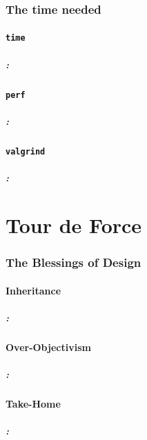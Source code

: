 \documentclass[9pt,xcolor=table]{beamer}
\begin{document}
\section[Measurement]{The time needed}
\subsection{\texttt{time}}
\begin{frame}
\frametitle{\insertsectionhead{}: \insertsubsectionhead{}}
\end{frame}

\subsection{\texttt{perf}}
\begin{frame}
\frametitle{\insertsectionhead{}: \insertsubsectionhead{}}
\end{frame}

\subsection{\texttt{valgrind}}
\begin{frame}
\frametitle{\insertsectionhead{}: \insertsubsectionhead{}}
\end{frame}


\part{Tour de Force}
\section{The Blessings of Design}
\subsection{Inheritance}
\begin{frame}
\frametitle{\insertsectionhead{}: \insertsubsectionhead{}}
\end{frame}

\subsection{Over-Objectivism}
\begin{frame}
\frametitle{\insertsectionhead{}: \insertsubsectionhead{}}
\end{frame}

\subsection{Take-Home}
\begin{frame}
\frametitle{\insertsectionhead{}: \insertsubsectionhead{}}
\end{frame}
\end{document}
